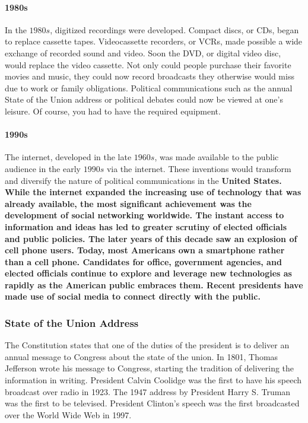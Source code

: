 \paragraph{1980s} In the $1980s$, digitized recordings were developed. Compact discs, or CDs, began to replace cassette tapes. Videocassette recorders, or VCRs, made possible a wide exchange of recorded sound and video. Soon the DVD, or digital video disc, would replace the video cassette. Not only could people purchase their favorite movies and music, they could now record broadcasts they otherwise would miss due to work or family obligations. Political communications such as the annual State of the Union address or political debates could now be viewed at one's leisure. Of course, you had to have the required equipment.

\paragraph{1990s} The internet, developed in the late $1960s$, was made available to the public audience in the early $1990s$ via the internet. These inventions would transform and diversify the nature of political communications in the \bf{United States}. While the internet expanded the increasing use of technology that was already available, the most significant achievement was the development of social networking worldwide. The instant access to information and ideas has led to greater scrutiny of elected officials and public policies. The later years of this decade saw an explosion of cell phone users. Today, most Americans own a smartphone rather than a cell phone. Candidates for office, government agencies, and elected officials continue to explore and leverage new technologies as rapidly as the American public embraces them. Recent presidents have made use of social media to connect directly with the public.

\subsubsection*{State of the Union Address}

The Constitution states that one of the duties of the president is to deliver an annual message to Congress about the state of the union. In 1801, Thomas Jefferson wrote his message to Congress, starting the tradition of delivering the information in writing. President Calvin Coolidge was the first to have his speech broadcast over radio in 1923. The 1947 address by President Harry S. Truman was the first to be televised. President Clinton's speech was the first broadcasted over the World Wide Web in 1997.

